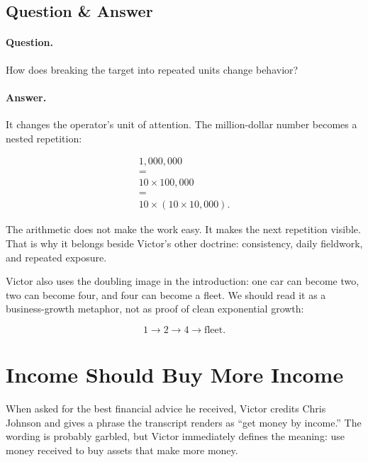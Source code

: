 \documentclass[11pt,oneside]{book}
\begin{document}
\subsection{Question \& Answer}

\paragraph{Question.}
How does breaking the target into repeated units change behavior?

\paragraph{Answer.}
It changes the operator's unit of attention. The million-dollar number becomes a nested repetition:

\begin{equation}
\begin{gathered}
1{,}000{,}000\\
=\\
10 \times 100{,}000\\
=\\
10 \times (10 \times 10{,}000).
\end{gathered}
\end{equation}

The arithmetic does not make the work easy. It makes the next repetition visible. That is why it belongs beside Victor's other doctrine: consistency, daily fieldwork, and repeated exposure.

Victor also uses the doubling image in the introduction: one car can become two, two can become four, and four can become a fleet. We should read it as a business-growth metaphor, not as proof of clean exponential growth:

\begin{equation}
1 \longrightarrow 2 \longrightarrow 4 \longrightarrow \text{fleet}.
\end{equation}

\section{Income Should Buy More Income}

When asked for the best financial advice he received, Victor credits Chris Johnson and gives a phrase the transcript renders as ``get money by income.'' The wording is probably garbled, but Victor immediately defines the meaning: use money received to buy assets that make more money.
\end{document}
